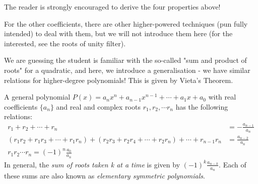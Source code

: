 \documentclass[../jarvis.tex]{subfiles}
\begin{document}
The reader is strongly encouraged to derive the four properties above!

For the other coefficients, there are other higher-powered techniques (pun fully intended) to deal with them, but we will not introduce them here (for the interested, see the roots of unity filter).

We are guessing the student is familiar with the so-called "sum and product of roots" for a quadratic, and here, we introduce a generalisation - we have similar relations for higher-degree polynomials! This is given by Vieta's Theorem.

\begin{proposition}
    A general polynomial $P(x)=a_nx^n+a_{n-1}x^{n-1}+\cdots+a_1x+a_0$ with real coefficients $\{a_n\}$ and real and complex roots $r_1, r_2, \cdots r_n$ has the following relations:
    \begin{align*}
        r_1+r_2+\cdots+r_n&=-\frac{a_{n-1}}{a_n}\\
        (r_1r_2+r_1r_3+\cdots+r_1r_n)+(r_2r_3+r_2r_4+\cdots+r_2r_n)+\cdots+r_{n-1}r_n&=\frac{a_{n-2}}{a_n} \\
        r_1r_2\cdots r_n=(-1)^n\frac{a_0}{a_n}
    \end{align*}
    In general, the \textit{sum of roots taken k at a time} is given by $(-1)^k\frac{a_{n-k}}{a_n}.$ Each of these sums are also known as \textit{elementary symmetric polynomials}.
\end{proposition}
\end{document}
